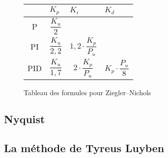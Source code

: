 \def\tabularxcolumn#1{m{#1}}
\begin{figure}[ht]
	\begin{center}
		\begin{tabularx}{\textwidth}{| c | X | X | X |}
			\hline
			& $K_p$ & $K_i$ & $K_d$\\ \hline
			P & \begin{equation*}\frac{K_u}{2}\end{equation*} & &\\ \hline
			PI & \begin{equation*}\frac{K_u}{2,2}\end{equation*} & \begin{equation*}1,2 \cdot \frac{K_p}{P_u}\end{equation*} &\\ \hline
			PID & \begin{equation*}\frac{K_u}{1,7}\end{equation*} & \begin{equation*}2 \cdot \frac{K_p}{P_u}\end{equation*} & \begin{equation*}K_p \cdot \frac{P_u}{8}\end{equation*} \\
			\hline
		\end{tabularx}
	\end{center}
	\caption{Tableau des formules pour Ziegler–Nichols}
	\label{tab:ZieglerNicholsTuningFormulas}
\end{figure}

\subsection{Nyquist}

\subsection{La méthode de Tyreus Luyben}
